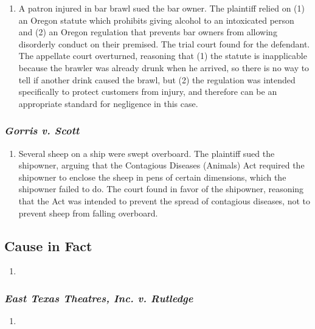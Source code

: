 \begin{enumerate}
    \item A patron injured in bar brawl sued the bar owner. The plaintiff relied on (1) an Oregon statute which prohibits giving alcohol to an intoxicated person and (2) an Oregon regulation that prevents bar owners from allowing disorderly conduct on their premised. The trial court found for the defendant. The appellate court overturned, reasoning that (1) the statute is inapplicable because the brawler was already drunk when he arrived, so there is no way to tell if another drink caused the brawl, but (2) the regulation was intended specifically to protect customers from injury, and therefore can be an appropriate standard for negligence in this case.
\end{enumerate}

\subsubsection{\emph{Gorris v. Scott}}

\begin{enumerate}
    \item Several sheep on a ship were swept overboard. The plaintiff sued the shipowner, arguing that the Contagious Diseases (Animals) Act required the shipowner to enclose the sheep in pens of certain dimensions, which the shipowner failed to do. The court found in favor of the shipowner, reasoning that the Act was intended to prevent the spread of contagious diseases, not to prevent sheep from falling overboard.
\end{enumerate}

\subsection{Cause in Fact}

\begin{enumerate}
    \item 
\end{enumerate}

\subsubsection{\emph{East Texas Theatres, Inc. v. Rutledge}}

\begin{enumerate}
    \item
\end{enumerate}

